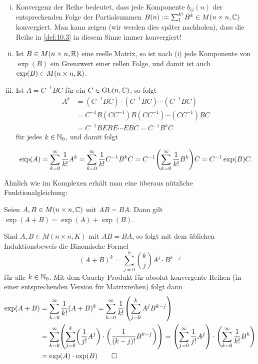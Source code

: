 \begin{bemerkung}
	\label{bem:10.4}
	\mbox{} \\[-1.4cm]
	\begin{enumerate}[(i)]
		\item Konvergenz der Reihe bedeutet, dass jede Komponente $b_{ij}(n)$ der entsprechenden Folge der Partialsummen $B(n) := \sum_{1}^{k!} B^{k} \in M(n \times n,\mathbb{C})$ konvergiert.
		Man kann zeigen (wir werden dies später nachholen), dass die Reihe in \autoref{def:10.3} in diesem Sinne immer konvergiert!
		\item Ist $B \in M(n \times n,\mathbb{R})$ eine reelle Matrix, so ist nach (i) jede Komponente von $\exp(B)$ ein Grenzwert einer rellen Folge, und damit ist auch $\exp(B) \in M(n \times n,\mathbb{R})$.
		\item Ist $A = C^{-1} BC$ für ein $C \in \operatorname{GL}(n,\mathbb{C})$, so folgt
		\begin{align*}
			A^{k} &= (C^{-1}BC)\cdot (C^{-1}BC) \cdots (C^{-1}BC) \\
			&= C^{-1} B (CC^{-1}) B (CC^{-1}) \cdots (CC^{-1})BC \\
			&= C^{-1} B E B E \cdots E BC = C^{-1} B^k C
		\end{align*}
		für jedes $k \in \mathbb{N}_0$, und damit folgt
		
		\[
			\exp(A) = \sum\limits_{k=0}^{\infty} \frac{1}{k!} A^k = \sum_{k=0}^{\infty} \frac{1}{k!} C^{-1} B^{k} C = C^{-1} \enb{\sum_{k=0}^{\infty} \frac{1}{k!} B^{k}} C = C^{-1} \exp(B) C.
		\]
	\end{enumerate}
\end{bemerkung}

Ähnlich wie im Komplexen erhält man eine überaus nützliche Funktionalgleichung:

\begin{lemma}
	\label{lemma:10.5}
	Seien $A,B \in M(n \times n,\mathbb{C})$ mit $AB = BA$.
	Dann gilt $\exp(A+B) = \exp(A) + \exp(B)$.
\end{lemma}

\begin{beweis}[Skizze]
	Sind $A,B \in M(n \times n,K)$ mit $AB = BA$, so folgt mit dem üblichen Induktionsbeweis  die Binomische Formel
	\[
		(A+B)^{k} = \sum_{j=0}^{k} \binom{k}{j} A^{j} \cdot B^{k-j}
	\]
	für alle $k \in \mathbb{N}_0$.
	Mit dem Cauchy-Produkt für absolut konvergente Reihen (in einer entsprechenden Version für Matrixreihen) folgt dann
	\begin{align*}
		\exp(A+B) &= \sum_{k=0}^{\infty} \frac{1}{k!} (A+B)^k = \sum_{k=0}^{\infty} \frac{1}{k!} \enb{\sum_{j=0}^{k} A^{j} B^{k-j}} \\
		&= \sum_{k=0}^{\infty} \enb{\sum_{j=0}^{k} \enb{\frac{1}{j!} A^{j}} \cdot \enb{\frac{1}{(k-j)!} B^{k-j}}} = \enb{\sum_{j=0}^{\infty} \frac{1}{j!} A^{j}} \cdot \enb{\sum_{k=0}^{\infty} \frac{1}{k!} B^{k}} \\
		&= \exp(A) \cdot \exp(B) \qedhere
	\end{align*}
\end{beweis}

